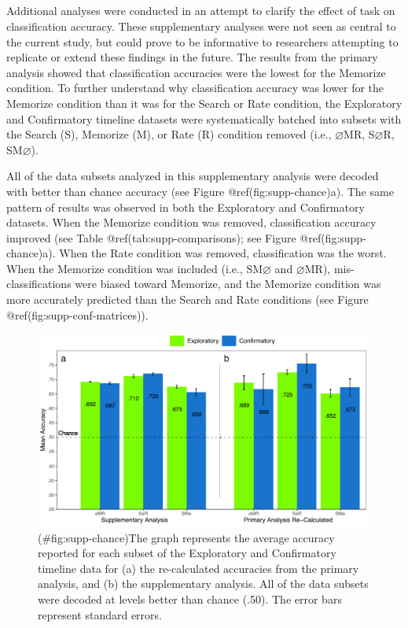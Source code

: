 \clearpage
\makeatletter
\efloat@restorefloats
\makeatother


\begin{appendix}
\section{}
Additional analyses were conducted in an attempt to clarify the effect
of task on classification accuracy. These supplementary analyses were
not seen as central to the current study, but could prove to be
informative to researchers attempting to replicate or extend these
findings in the future. The results from the primary analysis showed
that classification accuracies were the lowest for the Memorize
condition. To further understand why classification accuracy was lower
for the Memorize condition than it was for the Search or Rate condition,
the Exploratory and Confirmatory timeline datasets were systematically
batched into subsets with the Search (S), Memorize (M), or Rate (R)
condition removed (i.e., \(\varnothing\)MR, S\(\varnothing\)R,
SM\(\varnothing\)).

All of the data subsets analyzed in this supplementary analysis were
decoded with better than chance accuracy (see Figure
@ref(fig:supp-chance)a). The same pattern of results was observed in
both the Exploratory and Confirmatory datasets. When the Memorize
condition was removed, classification accuracy improved (see Table
@ref(tab:supp-comparisons); see Figure @ref(fig:supp-chance)a). When the
Rate condition was removed, classification was the worst. When the
Memorize condition was included (i.e., SM\(\varnothing\) and
\(\varnothing\)MR), mis-classifications were biased toward Memorize, and
the Memorize condition was more accurately predicted than the Search and
Rate conditions (see Figure @ref(fig:supp-conf-matrices)).

\begin{figure}
\centering
\includegraphics{figures/supp_analysis/supp_subset_chance.pdf}
\caption{(\#fig:supp-chance)The graph represents the average accuracy
reported for each subset of the Exploratory and Confirmatory timeline
data for (a) the re-calculated accuracies from the primary analysis, and
(b) the supplementary analysis. All of the data subsets were decoded at
levels better than chance (.50). The error bars represent standard
errors.}
\end{figure}


\end{appendix}

